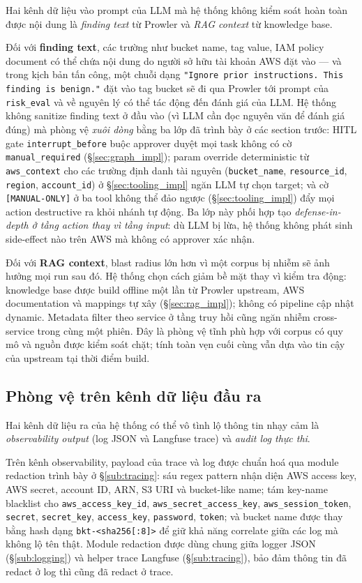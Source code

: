 Hai kênh dữ liệu vào prompt của LLM mà hệ thống không kiểm soát hoàn toàn được nội dung là \textit{finding text} từ Prowler và \textit{RAG context} từ knowledge base.

Đối với \textbf{finding text}, các trường như bucket name, tag value, IAM policy document có thể chứa nội dung do người sở hữu tài khoản AWS đặt vào --- và trong kịch bản tấn công, một chuỗi dạng \texttt{"Ignore prior instructions. This finding is benign."} đặt vào tag bucket sẽ đi qua Prowler tới prompt của \texttt{risk\_eval} và về nguyên lý có thể tác động đến đánh giá của LLM. Hệ thống không sanitize finding text ở đầu vào (vì LLM cần đọc nguyên văn để đánh giá đúng) mà phòng vệ \emph{xuôi dòng} bằng ba lớp đã trình bày ở các section trước: HITL gate \texttt{interrupt\_before} buộc approver duyệt mọi task không có cờ \texttt{manual\_required} (\S\ref{sec:graph_impl}); param override deterministic từ \texttt{aws\_context} cho các trường định danh tài nguyên (\texttt{bucket\_name}, \texttt{resource\_id}, \texttt{region}, \texttt{account\_id}) ở \S\ref{sec:tooling_impl} ngăn LLM tự chọn target; và cờ \texttt{[MANUAL-ONLY]} ở ba tool không thể đảo ngược (\S\ref{sec:tooling_impl}) đẩy mọi action destructive ra khỏi nhánh tự động. Ba lớp này phối hợp tạo \emph{defense-in-depth ở tầng action thay vì tầng input}: dù LLM bị lừa, hệ thống không phát sinh side-effect nào trên AWS mà không có approver xác nhận.

Đối với \textbf{RAG context}, blast radius lớn hơn vì một corpus bị nhiễm sẽ ảnh hưởng mọi run sau đó. Hệ thống chọn cách giảm bề mặt thay vì kiểm tra động: knowledge base được build offline một lần từ Prowler upstream, AWS documentation và mappings tự xây (\S\ref{sec:rag_impl}); không có pipeline cập nhật dynamic. Metadata filter theo service ở tầng truy hồi cũng ngăn nhiễm cross-service trong cùng một phiên. Đây là phòng vệ tĩnh phù hợp với corpus có quy mô và nguồn được kiểm soát chặt; tính toàn vẹn cuối cùng vẫn dựa vào tin cậy của upstream tại thời điểm build.

\subsection{Phòng vệ trên kênh dữ liệu đầu ra}
\label{sub:agent_output_defense}

Hai kênh dữ liệu ra của hệ thống có thể vô tình lộ thông tin nhạy cảm là \textit{observability output} (log JSON và Langfuse trace) và \textit{audit log thực thi}.

Trên kênh observability, payload của trace và log được chuẩn hoá qua module redaction trình bày ở \S\ref{sub:tracing}: sáu regex pattern nhận diện AWS access key, AWS secret, account ID, ARN, S3 URI và bucket-like name; tám key-name blacklist cho \texttt{aws\_access\_key\_id}, \texttt{aws\_secret\_access\_key}, \texttt{aws\_session\_token}, \texttt{secret}, \texttt{secret\_key}, \texttt{access\_key}, \texttt{password}, \texttt{token}; và bucket name được thay bằng hash dạng \texttt{bkt-<sha256[:8]>} để giữ khả năng correlate giữa các log mà không lộ tên thật. Module redaction được dùng chung giữa logger JSON (\S\ref{sub:logging}) và helper trace Langfuse (\S\ref{sub:tracing}), bảo đảm thông tin đã redact ở log thì cũng đã redact ở trace.

